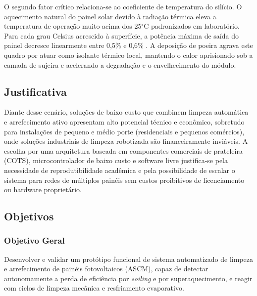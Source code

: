 \documentclass[12pt, a4paper]{article}
\begin{document}
O segundo fator crítico relaciona-se ao coeficiente de temperatura do silício. O aquecimento natural do painel solar devido à radiação térmica eleva a temperatura de operação muito acima dos 25$^\circ$C padronizados em laboratório. Para cada grau Celsius acrescido à superfície, a potência máxima de saída do painel decresce linearmente entre 0,5\% e 0,6\% \cite{geetha2024}. A deposição de poeira agrava este quadro por atuar como isolante térmico local, mantendo o calor aprisionado sob a camada de sujeira e acelerando a degradação e o envelhecimento do módulo.

\subsection{Justificativa}

Diante desse cenário, soluções de baixo custo que combinem limpeza automática e arrefecimento ativo apresentam alto potencial técnico e econômico, sobretudo para instalações de pequeno e médio porte (residenciais e pequenos comércios), onde soluções industriais de limpeza robotizada são financeiramente inviáveis. A escolha por uma arquitetura baseada em componentes comerciais de prateleira (COTS), microcontrolador de baixo custo e software livre justifica-se pela necessidade de reprodutibilidade acadêmica e pela possibilidade de escalar o sistema para redes de múltiplos painéis sem custos proibitivos de licenciamento ou hardware proprietário.

\subsection{Objetivos}

\subsubsection{Objetivo Geral}
Desenvolver e validar um protótipo funcional de sistema automatizado de limpeza e arrefecimento de painéis fotovoltaicos (ASCM), capaz de detectar autonomamente a perda de eficiência por \textit{soiling} e por superaquecimento, e reagir com ciclos de limpeza mecânica e resfriamento evaporativo.
\end{document}
